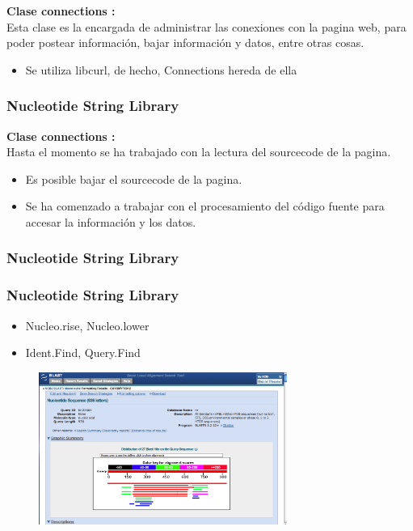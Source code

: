 \documentclass{beamer}
\begin{document}
\begin{frame}
\textbf{\large{Clase connections :}} \\
Esta clase es la encargada de administrar las conexiones con la pagina web, para poder postear información, bajar información y datos, entre otras cosas.
\begin{block}{}
\begin{itemize}
\item Se utiliza libcurl, de hecho, Connections hereda de ella
\end{itemize}
\end{block}
\frametitle{Nucleotide String Library}
\end{frame}

\begin{frame}
\textbf{\large{Clase connections :}} \\
Hasta el momento se ha trabajado con la lectura del sourcecode de la pagina.
\begin{block}{}
\begin{itemize}
\item Es posible bajar el sourcecode de la pagina.
\item Se ha comenzado a trabajar con el procesamiento del c\'odigo fuente para accesar la informaci\'on y los datos.
\end{itemize}
\end{block}
\frametitle{Nucleotide String Library}
\end{frame}

\begin{frame}
\frametitle{Nucleotide String Library}
\begin{itemize}
\item{Nucleo.rise, Nucleo.lower }
\item{Ident.Find, Query.Find}
\end{itemize}
\begin{figure}
		\includegraphics[width=3.2in]{BLAST.png}
\end{figure}
\end{frame}
\end{document}
